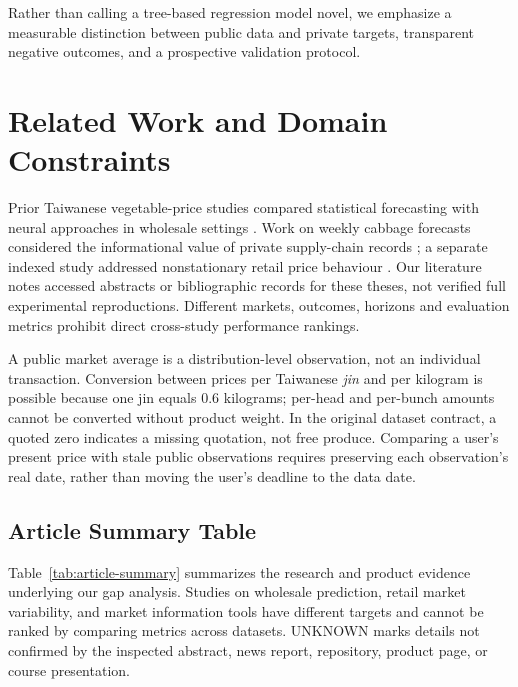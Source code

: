 \documentclass[conference]{IEEEtran}
\begin{document}
Rather than calling a tree-based regression model novel, we emphasize a measurable distinction between public data and private targets, transparent negative outcomes, and a prospective validation protocol.

\section{Related Work and Domain Constraints}
Prior Taiwanese vegetable-price studies compared statistical forecasting with neural approaches in wholesale settings \cite{chen2024}. Work on weekly cabbage forecasts considered the informational value of private supply-chain records \cite{lee2015}; a separate indexed study addressed nonstationary retail price behaviour \cite{lin2017}. Our literature notes accessed abstracts or bibliographic records for these theses, not verified full experimental reproductions. Different markets, outcomes, horizons and evaluation metrics prohibit direct cross-study performance rankings.

A public market average is a distribution-level observation, not an individual transaction. Conversion between prices per Taiwanese \emph{jin} and per kilogram is possible because one jin equals $0.6$ kilograms; per-head and per-bunch amounts cannot be converted without product weight. In the original dataset contract, a quoted zero indicates a missing quotation, not free produce. Comparing a user's present price with stale public observations requires preserving each observation's real date, rather than moving the user's deadline to the data date.

\subsection{Article Summary Table}
Table~\ref{tab:article-summary} summarizes the research and product evidence underlying our gap analysis. Studies on wholesale prediction, retail market variability, and market information tools have different targets and cannot be ranked by comparing metrics across datasets. UNKNOWN marks details not confirmed by the inspected abstract, news report, repository, product page, or course presentation.
\end{document}
